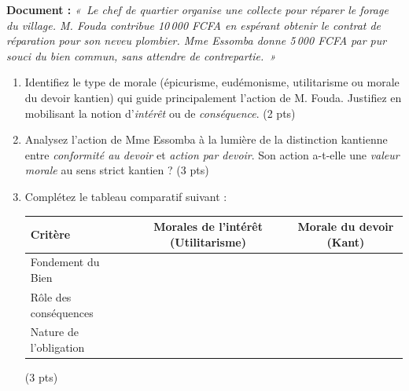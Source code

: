 \documentclass[11pt]{article}
\begin{document}
\begin{exercice}
\textbf{Document :} \textit{«~Le chef de quartier organise une collecte pour réparer le forage du village. M. Fouda contribue 10\,000 FCFA en espérant obtenir le contrat de réparation pour son neveu plombier. Mme Essomba donne 5\,000 FCFA par pur souci du bien commun, sans attendre de contrepartie.~»}
\begin{enumerate}
    \item Identifiez le type de morale (épicurisme, eudémonisme, utilitarisme ou morale du devoir kantien) qui guide principalement l'action de M. Fouda. Justifiez en mobilisant la notion d'\textit{intérêt} ou de \textit{conséquence}. \hfill (2 pts)
    \item Analysez l'action de Mme Essomba à la lumière de la distinction kantienne entre \textit{conformité au devoir} et \textit{action par devoir}. Son action a-t-elle une \textit{valeur morale} au sens strict kantien ? \hfill (3 pts)
    \item Complétez le tableau comparatif suivant :
    \begin{center}
    \begin{tabular}{|l|c|c|}
    \hline
    \textbf{Critère} & \textbf{Morales de l'intérêt (Utilitarisme)} & \textbf{Morale du devoir (Kant)} \\
    \hline
    Fondement du Bien &  &  \\
    \hline
    Rôle des conséquences &  &  \\
    \hline
    Nature de l'obligation &  &  \\
    \hline
    \end{tabular}
    \end{center}
    \hfill (3 pts)
\end{enumerate}
\end{exercice}
\end{document}
